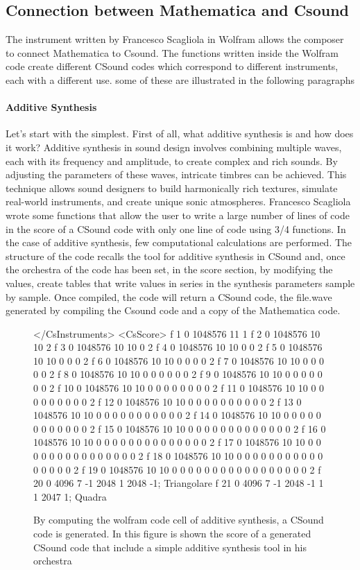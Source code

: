 		\subsection{Connection between Mathematica and Csound}
		The instrument written by Francesco Scagliola in Wolfram allows the composer to connect Mathematica to Csound.
		The functions written inside the Wolfram code create different CSound codes which correspond to different instruments, each with a different use. some of these are illustrated in the following paragraphs
		
		\paragraph{Additive Synthesis} Let's start with the simplest.
		First of all, what additive synthesis is and how does it work?
		Additive synthesis in sound design involves combining multiple waves, each with its frequency and amplitude, to create complex and rich sounds. By adjusting the parameters of these waves, intricate timbres can be achieved. This technique allows sound designers to build harmonically rich textures, simulate real-world instruments, and create unique sonic atmospheres.
		Francesco Scagliola wrote some functions that allow the user to write a large number of lines of code in the score of a CSound code with only one line of code using 3/4 functions. In the case of additive synthesis, few computational calculations are performed. 
		The structure of the code recalls the tool for additive synthesis in CSound and, once the orchestra of the code has been set, in the score section, by modifying the values, create tables that write values ​​in series in the synthesis parameters sample by sample. Once compiled, the code will return a CSound code, the file.wave generated by compiling the Csound code and a copy of the Mathematica code.
		
\begin{figure}[h]
	\begin{code}
</CsInstruments>		
<CsScore>				
f 1 0 1048576 11  1 
f 2 0 1048576 10  10 2
f 3 0 1048576 10  10 0 2
f 4 0 1048576 10  10 0 0 2
f 5 0 1048576 10  10 0 0 0 2
f 6 0 1048576 10  10 0 0 0 0 2
f 7 0 1048576 10  10 0 0 0 0 0 2
f 8 0 1048576 10  10 0 0 0 0 0 0 2
f 9 0 1048576 10  10 0 0 0 0 0 0 0 2
f 10 0 1048576 10 10 0 0 0 0 0 0 0 0 2
f 11 0 1048576 10 10 0 0 0 0 0 0 0 0 0 2
f 12 0 1048576 10 10 0 0 0 0 0 0 0 0 0 0 2
f 13 0 1048576 10 10 0 0 0 0 0 0 0 0 0 0 0 2
f 14 0 1048576 10 10 0 0 0 0 0 0 0 0 0 0 0 0 2
f 15 0 1048576 10 10 0 0 0 0 0 0 0 0 0 0 0 0 0 2
f 16 0 1048576 10 10 0 0 0 0 0 0 0 0 0 0 0 0 0 0 2
f 17 0 1048576 10 10 0 0 0 0 0 0 0 0 0 0 0 0 0 0 0 2
f 18 0 1048576 10 10 0 0 0 0 0 0 0 0 0 0 0 0 0 0 0 0 2
f 19 0 1048576 10 10 0 0 0 0 0 0 0 0 0 0 0 0 0 0 0 0 0 2
f 20 0 4096 7 -1 2048 1 2048 -1; Triangolare
f 21 0 4096 7 -1 2048 -1  1 1  2047 1; Quadra
	\end{code}
	\caption{By computing the wolfram code cell of additive synthesis, a CSound code is generated. In this figure is shown the score of a generated CSound code that include a simple additive synthesis tool in his orchestra}
\end{figure}
		
